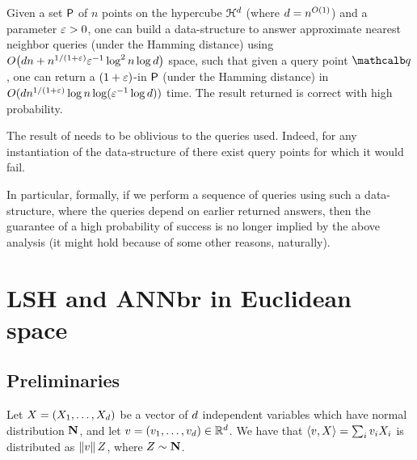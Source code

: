 \begin{theorem}
    Given a set ${\mathsf{P}}$ of $n$ points on the hypercube
    $\EuScript{H}^{d}$ (where $d = n^{O(1)}$) and a parameter
    ${\varepsilon}>0$, one can build a data-structure to answer approximate
    nearest neighbor queries (under the Hamming distance) using
    \begin{math}
        O\bigl( d n + { n^{1/(1+{\varepsilon})}}{\varepsilon}^{-1} \log^2 n \log
        d \bigr)
    \end{math}
    space, such that given a query point $\query$, one can return
    a $(1+{\varepsilon})$-\ANNbr in ${\mathsf{P}}$ (under the Hamming distance) in
    $O( d n^{1/(1+{\varepsilon})} \log n \log ({\varepsilon}^{-1} \log d ) )$
    time. The result returned is correct with high probability.
\end{theorem}


\begin{remark}
    The result of  needs to be oblivious to
    the queries used. Indeed, for any instantiation of the
    data-structure of  there exist query
    points for which it would fail.

    In particular, formally, if we perform a sequence of \ANNbr
    queries using such a data-structure, where the queries depend on
    earlier returned answers, then the guarantee of a high probability
    of success is no longer implied by the above analysis (it might
    hold because of some other reasons, naturally).
\end{remark}




\section{LSH and ANN{}br in Euclidean space}

\subsection{Preliminaries}

\begin{lemma}
    Let $X= ( X_1,\ldots, X_d)$ be a vector of $d$ independent
    variables which have normal distribution $\mathbf{N}$, and
    let $v = (v_1,\ldots, v_d) \in \mathbb{R}^d$. We have that
    $\left\langle {{v},{X}} \right\rangle = \sum_{i} v_i X_i$ is distributed as $\left\| {v} \right\|
    Z$, where $Z \sim \mathbf{N}$.
\end{lemma}

